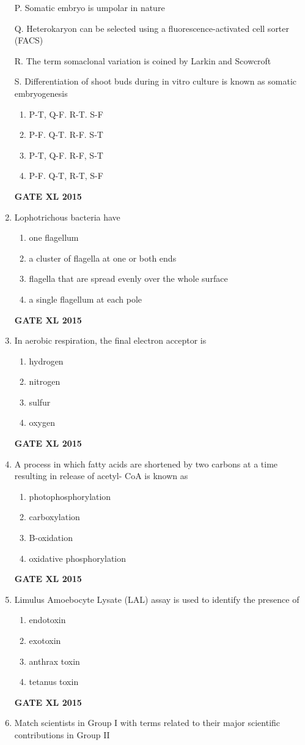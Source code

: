 \documentclass[journal,12pt,onecolumn]{IEEEtran}
\begin{document}
\begin{enumerate}
P. Somatic embryo is umpolar in nature

Q. Heterokaryon can be selected using a fluorescence-activated cell sorter (FACS)

R. The term somaclonal variation is coined by Larkin and Scowcroft

S. Differentiation of shoot buds during in vitro culture is known as somatic embryogenesis
    \begin{enumerate}
            \item  P-T, Q-F. R-T. S-F
	    \item  P-F. Q-T. R-F. S-T
	    \item P-T, Q-F. R-F, S-T
            \item P-F. Q-T, R-T, S-F
    \end{enumerate}
\hfill{\textbf{GATE XL 2015}}
\item Lophotrichous bacteria have
    \begin{enumerate}
            \item one flagellum
	    \item a cluster of flagella at one or both ends
	    \item flagella that are spread evenly over the whole surface
            \item a single flagellum at each pole
    \end{enumerate}
\hfill{\textbf{GATE XL 2015}}
\item In aerobic respiration, the final electron acceptor is
    \begin{enumerate}
            \item hydrogen
	    \item nitrogen
	    \item sulfur
            \item oxygen
    \end{enumerate}
\hfill{\textbf{GATE XL 2015}}
\item A process in which fatty acids are shortened by two carbons at a time resulting in release of acetyl-
CoA is known as
    \begin{enumerate}
            \item photophosphorylation
	    \item carboxylation
	    \item B-oxidation
            \item oxidative phosphorylation
    \end{enumerate}
\hfill{\textbf{GATE XL 2015}}
\item  Limulus Amoebocyte Lysate (LAL) assay is used to identify the presence of
    \begin{enumerate}
            \item endotoxin
	    \item exotoxin
	    \item anthrax toxin
            \item tetanus toxin
    \end{enumerate}
\hfill{\textbf{GATE XL 2015}}
\item Match scientists in Group I with terms related to their major scientific contributions in Group II


\end{enumerate}
\end{document}
